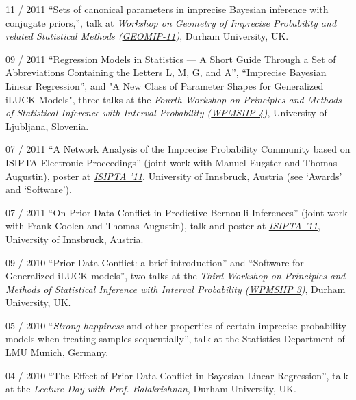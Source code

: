 \documentclass[a4paper]{simplecv}
\begin{document}
\begin{topic}
\item[11 / 2011] ``Sets of canonical parameters in imprecise Bayesian inference with conjugate priors,'', talk at
                 \emph{Workshop on Geometry of Imprecise Probability and related Statistical Methods (\href{http://maths.dur.ac.uk/stats/people/fc/geomip11.html}{GEOMIP-11})}, Durham University, UK.

\item[09 / 2011] ``Regression Models in Statistics --- A Short Guide Through a Set of Abbreviations Containing the Letters L, M, G, and A'',
                 ``Imprecise Bayesian Linear Regression'', and "A New Class of Parameter Shapes for Generalized iLUCK Models",
                 three talks at the
                 \emph{Fourth Workshop on Principles and Methods of Statistical Inference with Interval Probability (\href{http://wpmsiip2011.fdvinfo.net/c/646/Information/}{WPMSIIP 4})},
                 University of Ljubljana, Slovenia.

\item[07 / 2011] ``A Network Analysis of the Imprecise Probability Community based on ISIPTA Electronic Proceedings''
                 (joint work with Manuel Eugster and Thomas Augustin),
                 poster at \emph{\href{http://www.sipta.org/isipta11/}{ISIPTA '11}}, University of Innsbruck, Austria (see `Awards' and `Software').

\item[07 / 2011] ``On Prior-Data Conflict in Predictive Bernoulli Inferences'' (joint work with Frank Coolen and Thomas Augustin),
                 talk and poster at \emph{\href{http://www.sipta.org/isipta11/}{ISIPTA '11}}, University of Innsbruck, Austria.

\item[09 / 2010] ``Prior-Data Conflict: a brief introduction'' and ``Software for Generalized iLUCK-models'', two talks at the
                 \emph{Third Workshop on Principles and Methods of Statistical Inference with Interval Probability (\href{http://www.maths.dur.ac.uk/users/matthias.troffaes/wpmsiip2010/}{WPMSIIP 3})},
                 Durham University, UK.

\item[05 / 2010] ``\emph{Strong happiness} and other properties of certain imprecise probability models when treating samples sequentially'',
                 talk at the Statistics Department of LMU Munich, Germany.

\item[04 / 2010] ``The Effect of Prior-Data Conflict in Bayesian Linear Regression'', talk at the
                 \emph{Lecture Day with Prof. Balakrishnan}, Durham University, UK.


\end{topic}
\end{document}
